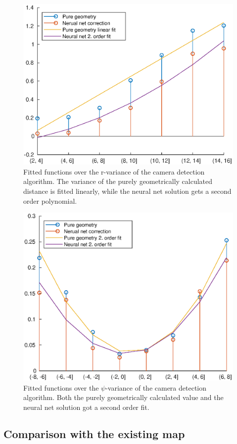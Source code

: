 \begin{figure}
    \centering
    \includegraphics[width=0.5\linewidth]{0_Images/3_Theory/camDetection/CameraRVarianceFit.eps}
    \caption[Fitted functions over the r-variance of the camera detection algorithm.]
    {Fitted functions over the r-variance of the camera detection algorithm. The variance of the purely geometrically calculated distance is fitted linearly, while the neural net solution gets a second order polynomial.}
    \label{Fig:CameraRVarianceFit}
\end{figure}

\begin{figure}
    \centering
    \includegraphics[width=0.5\linewidth]{0_Images/3_Theory/camDetection/CameraPsiVarianceFit.eps}
    \caption[Fitted functions over the $\psi$-variance of the camera detection algorithm.]
    {Fitted functions over the $\psi$-variance of the camera detection algorithm. Both the purely geometrically calculated value and the neural net solution got a second order fit.}
    \label{Fig:CameraPsiVarianceFit}
\end{figure}

\fi
\subsection{Comparison with the existing map}

